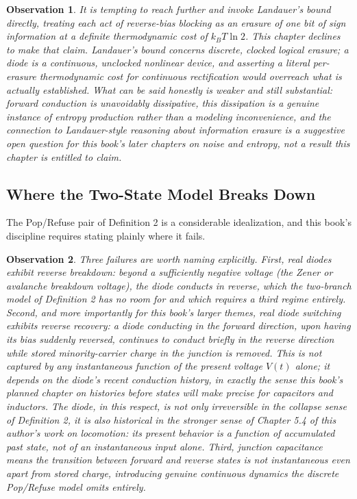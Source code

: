 \documentclass[12pt]{article}
\newtheorem{observation}{Observation}
\begin{document}
\begin{observation}
It is tempting to reach further and invoke Landauer's bound directly, treating each act of reverse-bias blocking as an erasure of one bit of sign information at a definite thermodynamic cost of $k_BT\ln 2$. This chapter declines to make that claim. Landauer's bound concerns discrete, clocked logical erasure; a diode is a continuous, unclocked nonlinear device, and asserting a literal per-erasure thermodynamic cost for continuous rectification would overreach what is actually established. What can be said honestly is weaker and still substantial: forward conduction is unavoidably dissipative, this dissipation is a genuine instance of entropy production rather than a modeling inconvenience, and the connection to Landauer-style reasoning about information erasure is a suggestive open question for this book's later chapters on noise and entropy, not a result this chapter is entitled to claim.
\end{observation}

\subsection{Where the Two-State Model Breaks Down}

The Pop/Refuse pair of Definition 2 is a considerable idealization, and this book's discipline requires stating plainly where it fails.

\begin{observation}
Three failures are worth naming explicitly. First, real diodes exhibit reverse breakdown: beyond a sufficiently negative voltage (the Zener or avalanche breakdown voltage), the diode conducts in reverse, which the two-branch model of Definition 2 has no room for and which requires a third regime entirely. Second, and more importantly for this book's larger themes, real diode switching exhibits reverse recovery: a diode conducting in the forward direction, upon having its bias suddenly reversed, continues to conduct briefly in the reverse direction while stored minority-carrier charge in the junction is removed. This is not captured by any instantaneous function of the present voltage $V(t)$ alone; it depends on the diode's recent conduction history, in exactly the sense this book's planned chapter on histories before states will make precise for capacitors and inductors. The diode, in this respect, is not only irreversible in the collapse sense of Definition 2, it is also historical in the stronger sense of Chapter 5.4 of this author's work on locomotion: its present behavior is a function of accumulated past state, not of an instantaneous input alone. Third, junction capacitance means the transition between forward and reverse states is not instantaneous even apart from stored charge, introducing genuine continuous dynamics the discrete Pop/Refuse model omits entirely.
\end{observation}
\end{document}
